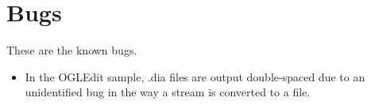\chapter{Bugs}\label{bugs}%
%
\setfooter{\thepage}{}{}{}{}{\thepage}

These are the known bugs.

\begin{itemize}\itemsep=0pt
\item In the OGLEdit sample, .dia files are output double-spaced
due to an unidentified bug in the way a stream is converted to a file.
\end{itemize}

